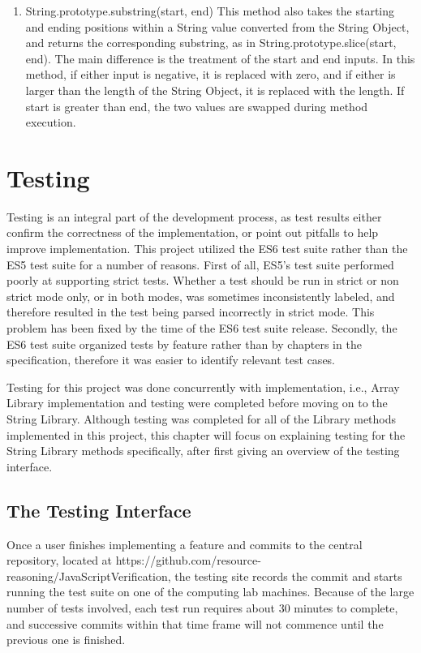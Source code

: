 \documentclass[a4paper,11pt,twoside]{report}
\begin{document}
\begin{enumerate}
\item String.prototype.substring(start, end) \newline
This method also takes the starting and ending positions within a String value converted from the String Object, and returns the corresponding substring, as in String.prototype.slice(start, end). The main difference is the treatment of the start and end inputs. In this method, if either input is negative, it is replaced with zero, and if either is larger than the length of the String Object, it is replaced with the length. If start is greater than end, the two values are swapped during method execution.
\end{enumerate}

\chapter{Testing}
Testing is an integral part of the development process, as test results either confirm the correctness of the implementation, or point out pitfalls to help improve implementation. This project utilized the ES6 test suite rather than the ES5 test suite for a number of reasons. First of all, ES5's test suite performed poorly at supporting strict tests. Whether a test should be run in strict or non strict mode only, or in both modes, was sometimes inconsistently labeled, and therefore resulted in the test being parsed incorrectly in strict mode. This problem has been fixed by the time of the ES6 test suite release. Secondly, the ES6 test suite organized tests by feature rather than by chapters in the specification, therefore it was easier to identify relevant test cases.

Testing for this project was done concurrently with implementation, i.e., Array Library implementation and testing were completed before moving on to the String Library. Although testing was completed for all of the Library methods implemented in this project, this chapter will focus on explaining testing for the String Library methods specifically, after first giving an overview of the testing interface.

\section{The Testing Interface}
Once a user finishes implementing a feature and commits to the central repository, located at https://github.com/resource-reasoning/JavaScriptVerification, the testing site records the commit and starts running the test suite on one of the computing lab machines. Because of the large number of tests involved, each test run requires about 30 minutes to complete, and successive commits within that time frame will not commence until the previous one is finished. 
\end{document}
